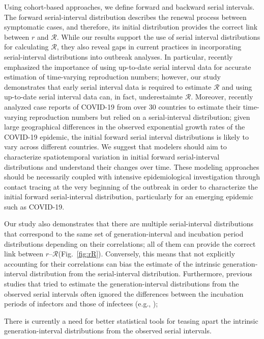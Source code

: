 \documentclass[12pt]{article}
\newcommand{\fref}[1]{Fig.~\ref{fig:#1}}
\newcommand{\RR}{\ensuremath{{\mathcal R}}\xspace}
\begin{document}
Using cohort-based approaches, we define forward and backward serial intervals.
The forward serial-interval distribution describes the renewal process between symptomatic cases, and therefore, its initial distribution provides the correct link between $r$ and \RR.
While our results support the use of serial interval distributions for calculating \RR, 
they also reveal gaps in current practices in incorporating serial-interval distributions into outbreak analyses.
In particular, \cite{thompson2019improved} recently emphasized the importance of using up-to-date serial interval data for accurate estimation of time-varying reproduction numbers;
however, our study demonstrates that early serial interval data is required to estimate \RR and using up-to-date serial interval data can, in fact, underestaimte \RR.
Moreover, \cite{tempvar} recently analyzed case reports of COVID-19 from over 30 countries to estimate their time-varying reproduction numbers but relied on a serial-interval distribution;
given large geographical differences in the observed exponential growth rates of the COVID-19 epidemic, the initial forward serial interval distributions is likely to vary across different countries.
We suggest that modelers should aim to characterize spatiotemporal variation in initial forward serial-interval distributions and understand their changes over time.
These modeling approaches should be necessarily coupled with intensive epidemiological investigation through contact tracing at the very beginning of the outbreak in order to characterize the initial forward serial-interval distribution, particularly for an emerging epidemic such as COVID-19.

Our study also demonstrates that there are multiple serial-interval distributions that correspond to the same set of generation-interval and incubation period distributions depending on their correlations;
all of them can provide the correct link between $r$--\RR (\fref{rR}).
Conversely, this means that not explicitly accounting for their correlations can bias the estimate of the intrinsic generation-interval distribution from the serial-interval distribution.
Furthermore, previous studies that tried to estimate the generation-interval distributions from the observed serial intervals often ignored the differences between the incubation periods of infectors and those of infectees (e.g., \cite{klinkenberg2011correlation, ganyani2020estimating});

There is currently a need for better statistical tools for teasing apart the intrinsic generation-interval distributions from the observed serial intervals.
\end{document}
